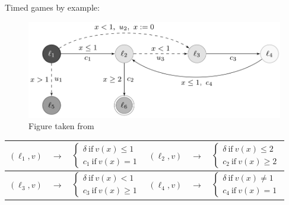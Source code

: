 \documentclass{beamer}
\theoremstyle{definition}
\begin{document}
\begin{frame}
\small
Timed games by example:
\begin{center}
  \begin{figure}
    \includegraphics[width=.85\textwidth]{../img/game.png}
    \\
    \tiny{Figure taken from \cite{handbook}}
  \end{figure}
  \begin{tabular}{|ccc|ccc|}
    \hline
    $(\ell_1, v)$ & $\rightarrow$ &
    $\begin{cases}
      \delta \ \text{if}\ v(x) \leq 1\\
      c_1 \ \text{if}\ v(x) = 1
    \end{cases}$ &
    $(\ell_2, v)$ & $\rightarrow$ &
    $\begin{cases}
      \delta \ \text{if}\ v(x) \leq 2\\
      c_2 \ \text{if}\ v(x) \geq 2
    \end{cases}$ \\
    \hline
    $(\ell_3, v)$ & $\rightarrow$ &
    $\begin{cases}
      \delta \ \text{if}\ v(x) < 1\\
      c_3 \ \text{if}\ v(x) \geq 1
    \end{cases}$ &
    $(\ell_4, v)$ & $\rightarrow$ &
    $\begin{cases}
      \delta \ \text{if}\ v(x) \neq 1\\
      c_4 \ \text{if}\ v(x) = 1
    \end{cases}$ \\
    \hline
  \end{tabular}
\end{center}
\end{frame}

\end{document}
